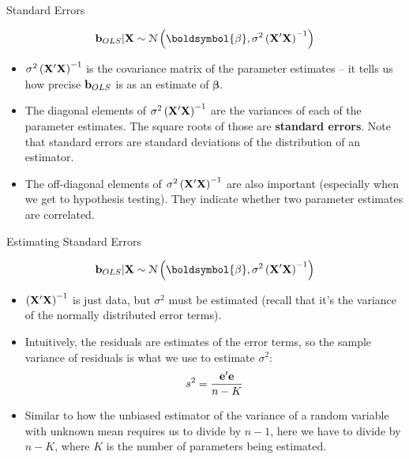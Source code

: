 \documentclass[aspectratio=169,11pt]{beamer}
\begin{document}
\begin{frame}{Standard Errors}

\[
	{\bf b}_{OLS} | {\bf X} \sim \mathcal{N}\left(\boldsymbol{\beta},\sigma^{2} \left({\bf X}'{\bf X}  \right)^{-1} \right)
	\]

\begin{itemize}
	\item $\sigma^{2} \left({\bf X}'{\bf X}  \right)^{-1}$ is the covariance matrix of the parameter estimates
	-- it tells us how precise ${\bf b}_{OLS}$ is as an estimate of $\boldsymbol{\beta}$.

	\item The diagonal elements of $\sigma^{2} \left({\bf X}'{\bf X}  \right)^{-1}$ are the variances of each of
	the parameter estimates. The square roots of those are {\bf standard errors}. Note that standard
	errors are standard deviations of the distribution of an estimator. 

	\item The off-diagonal elements of $\sigma^{2} \left({\bf X}'{\bf X}  \right)^{-1}$ are also important
	(especially when we get to hypothesis testing).
	They indicate whether two parameter estimates are correlated.

\end{itemize}
\end{frame}

\begin{frame}{Estimating Standard Errors}

\[
	{\bf b}_{OLS} | {\bf X} \sim \mathcal{N}\left(\boldsymbol{\beta},\sigma^{2} \left({\bf X}'{\bf X}  \right)^{-1} \right)
	\]

\begin{itemize}
	\item $\left({\bf X}'{\bf X}  \right)^{-1}$ is just data, but $\sigma^{2}$ must be estimated (recall that it's the 
	variance of the normally distributed error terms). 

	\item Intuitively, the residuals are estimates of the error terms, so the sample variance of residuals
	is what we use to estimate $\sigma^{2}$:\[
	s^{2} = \frac{{\bf e}'{\bf e}}{n-K}
	\]

	\item Similar to how the unbiased estimator of the variance of a random variable with unknown mean requires us to divide
	by $n-1$, here we have to divide by $n-K$, where $K$ is the number of parameters being estimated. 

	
\end{itemize}
\end{frame}
\end{document}
